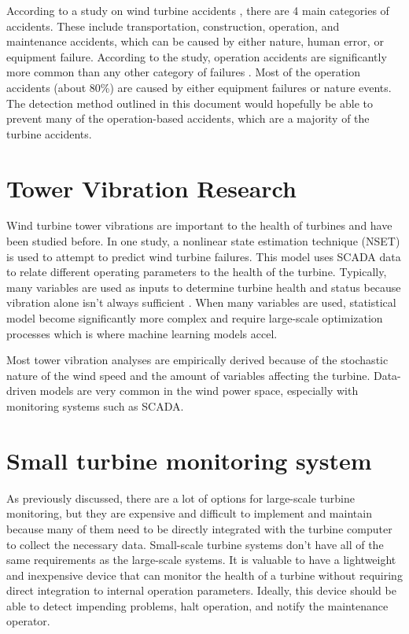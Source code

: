 According to a study on wind turbine accidents \cite{wind_turbine_accidents}, there are 4 main categories of accidents.  These include transportation, construction, operation, and maintenance accidents, which can be caused by either nature, human error, or equipment failure.  According to the study, operation accidents are significantly more common than any other category of failures \cite{wind_turbine_failures}.  Most of the operation accidents (about 80\%) are caused by either equipment failures or nature events.  The detection method outlined in this document would hopefully be able to prevent many of the operation-based accidents, which are a majority of the turbine accidents.

\section{Tower Vibration Research}
Wind turbine tower vibrations are important to the health of turbines and have been studied before.  In one study, a nonlinear state estimation technique \cite{NSET_vibration_modeling} (NSET) is used to attempt to predict wind turbine failures.  This model uses SCADA data to relate different operating parameters to the health of the turbine.  Typically, many variables are used as inputs to determine turbine health and status because vibration alone isn't always sufficient \cite{NSET_vibration_modeling}.  When many variables are used, statistical model become significantly more complex and require large-scale optimization processes which is where machine learning models accel.

Most tower vibration analyses are empirically derived because of the stochastic nature of the wind speed and the amount of variables affecting the turbine.  Data-driven models \cite{data_driven_online_monitoring} are very common in the wind power space, especially with monitoring systems such as SCADA.

\section{Small turbine monitoring system}
As previously discussed, there are a lot of options for large-scale turbine monitoring, but they are expensive and difficult to implement and maintain because many of them need to be directly integrated with the turbine computer to collect the necessary data.  Small-scale turbine systems don't have all of the same requirements as the large-scale systems.  It is valuable to have a lightweight and inexpensive device that can monitor the health of a turbine without requiring direct integration to internal operation parameters.  Ideally, this device should be able to detect impending problems, halt operation, and notify the maintenance operator.

